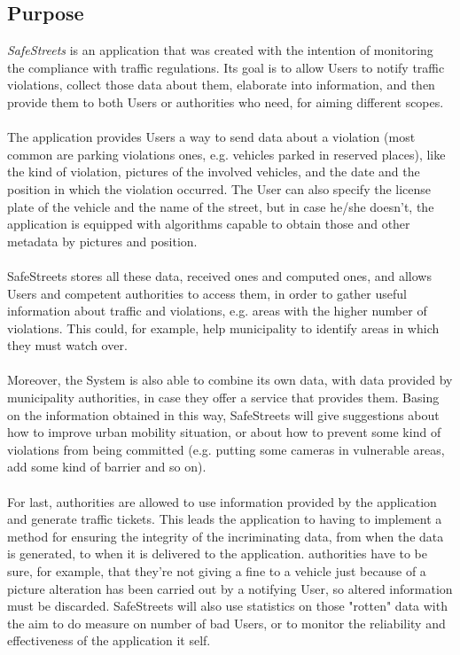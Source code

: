 \subsection{Purpose}
\textit{SafeStreets} is an application that was created with the intention of monitoring the compliance with traffic regulations. Its goal is to allow Users to notify traffic violations, collect those data about them, elaborate into information, and then provide them to both Users or authorities who need, for aiming different scopes. \\ \\
The application provides Users a way to send data about a violation (most common are parking violations ones, e.g. vehicles parked in reserved places), like the kind of violation, pictures of the involved vehicles, and the date and the position in which the violation occurred. The User can also specify the license plate of the vehicle and the name of the street, but in case he/she doesn't, the application is equipped with algorithms capable to obtain those and other metadata by pictures and position.\\\\
SafeStreets stores all these data, received ones and computed ones, and allows Users and competent authorities to access them, in order to gather useful information about traffic and violations, e.g. areas with the higher number of violations. This could, for example, help municipality to identify areas in which they must watch over.\\\\
Moreover, the System is also able to combine its own data, with data provided by municipality authorities, in case they offer a service that provides them. Basing on the information obtained in this way, SafeStreets will give suggestions about how to improve urban mobility situation, or about how to prevent some kind of violations from being committed (e.g. putting some cameras in vulnerable areas, add some kind of barrier and so on).\\\\
For last, authorities are allowed to use information provided by the application and generate traffic tickets. This leads the application to having to implement a method for ensuring the integrity of the incriminating data, from when the data is generated, to when it is delivered to the application. authorities have to be sure, for example, that they're not giving a fine to a vehicle just because of a picture alteration has been carried out by a notifying User, so altered information must be discarded. SafeStreets will also use statistics on those "rotten" data with the aim to do measure on number of bad Users, or to monitor the reliability and effectiveness of the application it self. \\\\

